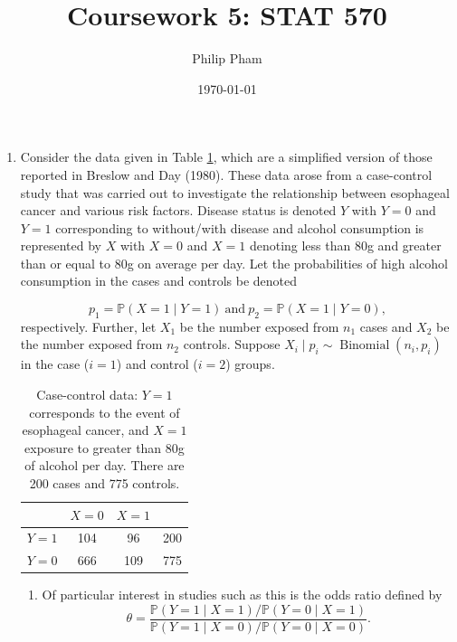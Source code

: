 \documentclass[letterpaper,11pt]{article}
\title{Coursework 5: STAT 570}
\author{Philip Pham}
\date{\today}
\begin{document}
\maketitle

\begin{enumerate}
\item Consider the data given in Table \ref{tab:p1_data}, which are a simplified
  version of those reported in Breslow and Day (1980). These data arose from a
  case-control study that was carried out to investigate the relationship
  between esophageal cancer and various risk factors. Disease status is denoted
  $Y$ with $Y = 0$ and $Y = 1$ corresponding to without/with disease and alcohol
  consumption is represented by $X$ with $X = 0$ and $X = 1$ denoting less than
  80g and greater than or equal to 80g on average per day. Let the probabilities
  of high alcohol consumption in the cases and controls be denoted

  \begin{equation}
    p_1 = \mathbb{P}\left(X = 1 \mid Y = 1\right)~\text{and}~
    p_2 = \mathbb{P}\left(X = 1 \mid Y = 0\right),
    \label{eqn:p1_pi_definition}
  \end{equation}
  respectively. Further, let $X_1$ be the number exposed from $n_1$ cases and
  $X_2$ be the number exposed from $n_2$ controls. Suppose
  $X_i \mid p_i \sim \operatorname{Binomial}(n_i,p_i)$ in the case ($i = 1$) and
  control ($i = 2$) groups.
  
  \begin{table}
    \centering
    \begin{tabular}{l|cc|c}
      & $X = 0$ & $X = 1$ & \\
      \hline
      $Y = 1$ & 104 & 96 & 200 \\
      $Y = 0$ & 666 & 109 & 775 \\
    \end{tabular}
    \caption{Case-control data: $Y = 1$ corresponds to the event of esophageal
      cancer, and $X = 1$ exposure to greater than 80g of alcohol per day. There
      are 200 cases and 775 controls.}
    \label{tab:p1_data}
  \end{table}

  \begin{enumerate}
  \item Of particular interest in studies such as this is the odds ratio defined
    by
    \begin{equation}
      \theta = \frac{\mathbb{P}\left(Y = 1 \mid X = 1\right)/\mathbb{P}\left(Y = 0 \mid X = 1\right)}
      {\mathbb{P}\left(Y = 1 \mid X = 0\right)/\mathbb{P}\left(Y = 0 \mid X = 0\right)}.
      \label{eqn:p1_odds_ratio}
    \end{equation}


\end{enumerate}
\end{enumerate}
\end{document}
